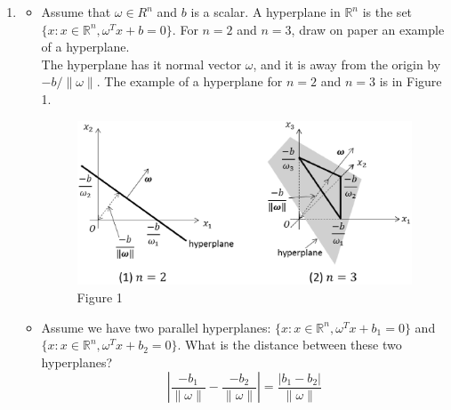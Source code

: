 \begin{enumerate}
\item 
\begin{itemize}
\item Assume that $\omega \in R^n$ and $b$ is a scalar. A hyperplane in $\mathbb{R}^n$ is the set $\{x : x\in \mathbb{R}^n, \omega^Tx+b=0\}$. For $n=2$ and $n=3$, draw on paper an example of a hyperplane.\\
The hyperplane has it normal vector $\omega$, and it is away from the origin by $-b/\|\omega\|$. The example of a hyperplane for $n=2$ and $n=3$ is in Figure 1.

\begin{figure}[hbtp]
\caption{Figure 1}
\centering
\includegraphics[scale=1]{figure1.eps}
\end{figure}


\item Assume we have two parallel hyperplanes: $\{x: x\in \mathbb{R}^n, \omega^Tx+b_1=0\}$ and $\{x: x\in \mathbb{R}^n, \omega^Tx+b_2=0\}$. What is the distance between these two hyperplanes?
\[
\left|\frac{-b_1}{\|\omega\|}-\frac{-b_2}{\|\omega\|}\right|=\frac{|b_1-b_2|}{\|\omega\|}
\]
\end{itemize}
\end{enumerate}

